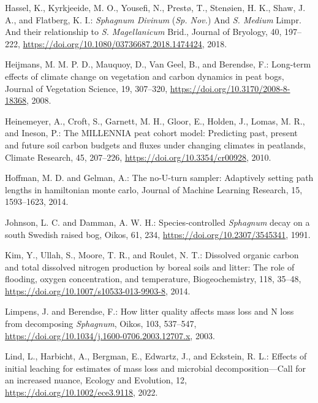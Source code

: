 \documentclass[
  12pt,
]{article}
\newlength{\cslhangindent}
\newlength{\cslentryspacingunit} %
\newenvironment{CSLReferences}[2] %
 {%
  \setlength{\parindent}{0pt}
  \ifodd #1
  \let\oldpar\par
  \def\par{\hangindent=\cslhangindent\oldpar}
  \fi
  \setlength{\parskip}{#2\cslentryspacingunit}
 }%
 {}
\begin{document}
\begin{CSLReferences}{0}{0}
\leavevmode{}%
Hassel, K., Kyrkjeeide, M. O., Yousefi, N., Prestø, T., Stenøien, H. K., Shaw, J. A., and Flatberg, K. I.: {\emph{Sphagnum Divinum}} ({\emph{Sp. Nov.}}) And {\emph{S}}{\emph{. Medium}} {Limpr}. And their relationship to {\emph{S}}{\emph{. Magellanicum}} {Brid}., Journal of Bryology, 40, 197--222, \url{https://doi.org/10.1080/03736687.2018.1474424}, 2018.

\leavevmode{}%
Heijmans, M. M. P. D., Mauquoy, D., Van Geel, B., and Berendse, F.: Long-term effects of climate change on vegetation and carbon dynamics in peat bogs, Journal of Vegetation Science, 19, 307--320, \url{https://doi.org/10.3170/2008-8-18368}, 2008.

\leavevmode{}%
Heinemeyer, A., Croft, S., Garnett, M. H., Gloor, E., Holden, J., Lomas, M. R., and Ineson, P.: The {MILLENNIA} peat cohort model: {Predicting} past, present and future soil carbon budgets and fluxes under changing climates in peatlands, Climate Research, 45, 207--226, \url{https://doi.org/10.3354/cr00928}, 2010.

\leavevmode{}%
Hoffman, M. D. and Gelman, A.: The no-{U-turn} sampler: {Adaptively} setting path lengths in hamiltonian monte carlo, Journal of Machine Learning Research, 15, 1593--1623, 2014.

\leavevmode{}%
Johnson, L. C. and Damman, A. W. H.: Species-controlled {\emph{Sphagnum}} decay on a south {Swedish} raised bog, Oikos, 61, 234, \url{https://doi.org/10.2307/3545341}, 1991.

\leavevmode{}%
Kim, Y., Ullah, S., Moore, T. R., and Roulet, N. T.: Dissolved organic carbon and total dissolved nitrogen production by boreal soils and litter: The role of flooding, oxygen concentration, and temperature, Biogeochemistry, 118, 35--48, \url{https://doi.org/10.1007/s10533-013-9903-8}, 2014.

\leavevmode{}%
Limpens, J. and Berendse, F.: How litter quality affects mass loss and {N} loss from decomposing {\emph{Sphagnum}}, Oikos, 103, 537--547, \url{https://doi.org/10.1034/j.1600-0706.2003.12707.x}, 2003.

\leavevmode{}%
Lind, L., Harbicht, A., Bergman, E., Edwartz, J., and Eckstein, R. L.: Effects of initial leaching for estimates of mass loss and microbial decomposition---{Call} for an increased nuance, Ecology and Evolution, 12, \url{https://doi.org/10.1002/ece3.9118}, 2022.


\end{CSLReferences}
\end{document}

